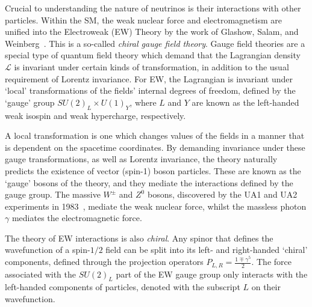 Crucial to understanding the nature of neutrinos is their interactions with other particles. Within the SM, the weak nuclear force and electromagnetism are unified into the Electroweak (EW) Theory by the work of Glashow, Salam, and Weinberg~\cite{glashowPartialsymmetriesWeakInteractions1961,weinbergModelLeptons1967,salamWeakElectromagneticInteractions1994}. %
This is a so-called \textit{chiral gauge field theory}. Gauge field theories are a special type of quantum field theory which demand that the Lagrangian density $\mathcal{L}$ is invariant under certain kinds of transformation, in addition to the usual requirement of Lorentz invariance. For EW, the Lagrangian is invariant under `local' transformations of the fields' internal degrees of freedom, defined by the `gauge' group $SU(2)_{L}\times U(1)_{Y}$, where $L$ and $Y$ are known as the left-handed weak isospin and weak hypercharge, respectively.

A local transformation is one which changes values of the fields in a manner that is dependent on the spacetime coordinates. By demanding invariance under these gauge transformations, as well as Lorentz invariance, the theory naturally predicts the existence of vector (spin-1) boson particles. These are known as the `gauge' bosons of the theory, and they mediate the interactions defined by the gauge group. The massive $W^{\pm}$ and $Z^{0}$ bosons, discovered by the UA1 and UA2 experiments in 1983~\cite{arnisonExperimentalObservationIsolated1983,bannerObservationSingleIsolated1983,arnisonExperimentalObservationLepton1983}, %
mediate the weak nuclear force, whilst the massless photon $\gamma$ mediates the electromagnetic force.

The theory of EW interactions is also \textit{chiral}. Any spinor that defines the wavefunction of a spin-$1/2$ field can be split into its left- and right-handed `chiral' components, defined through the projection operators $P_{L,R} = \frac{1\mp\gamma^{5}}{2}$. The force associated with the $SU(2)_{L}$ part of the EW gauge group only interacts with the left-handed components of particles, denoted with the subscript $L$ on their wavefunction.

